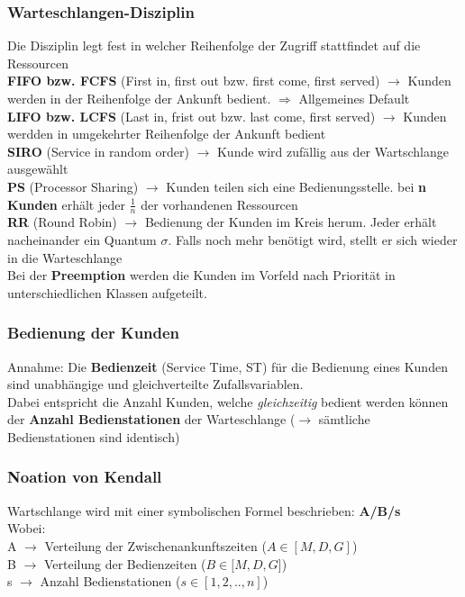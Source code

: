 \documentclass{report}
\theoremstyle{definition}
\theoremstyle{example}
\begin{document}
      \subsubsection{Warteschlangen-Disziplin}
Die Disziplin legt fest in welcher Reihenfolge der Zugriff stattfindet auf die Ressourcen\\
\textbf{FIFO bzw. FCFS} (First in, first out bzw. first come, first served) $\rightarrow$ Kunden werden in der Reihenfolge der Ankunft bedient. $\Rightarrow$ Allgemeines Default\\
\textbf{LIFO bzw. LCFS} (Last in, frist out bzw. last come, first served) $\rightarrow$ Kunden werdden in umgekehrter Reihenfolge der Ankunft bedient\\
\textbf{SIRO} (Service in random order) $\rightarrow$ Kunde wird zufällig aus der Wartschlange ausgewählt\\
\textbf{PS} (Processor Sharing) $\rightarrow$ Kunden teilen sich eine Bedienungsstelle. bei \textbf{n Kunden} erhält jeder $\frac{1}{n}$ der vorhandenen Ressourcen\\
\textbf{RR} (Round Robin) $\rightarrow$ Bedienung der Kunden im Kreis herum. Jeder erhält nacheinander ein Quantum $\sigma$. Falls noch mehr benötigt wird, stellt er sich wieder in die Warteschlange\\

Bei der \textbf{Preemption} werden die Kunden im Vorfeld nach Priorität in unterschiedlichen Klassen aufgeteilt.

      \subsubsection{Bedienung der Kunden}
Annahme: Die \textbf{Bedienzeit} (Service Time, ST) für die Bedienung eines Kunden sind unabhängige und gleichverteilte Zufallsvariablen.\\
Dabei entspricht die Anzahl Kunden, welche \textit{gleichzeitig} bedient werden können der \textbf{Anzahl Bedienstationen} der Warteschlange ($\rightarrow$ sämtliche Bedienstationen sind identisch)

      \subsubsection{Noation von Kendall}
Wartschlange wird mit einer symbolischen Formel beschrieben:
\textbf{A/B/s}\\
Wobei:\\
A $\rightarrow$ Verteilung der Zwischenankunftszeiten ($A \in [M,D,G]$)\\
B $\rightarrow$ Verteilung der Bedienzeiten ($B \in [M,D,G$])\\
s $\rightarrow$ Anzahl Bedienstationen ($s \in [1,2,..,n]$)\\
\end{document}
